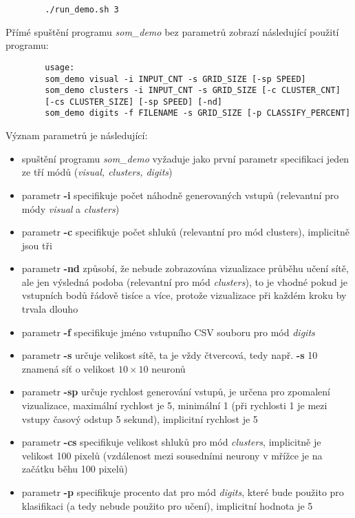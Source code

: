 \documentclass[11pt]{article}
\begin{document}
\begin{commandline}
	\begin{verbatim}
		./run_demo.sh 3
	\end{verbatim}
\end{commandline}

Přímé spuštění programu \textit{som\_demo} bez parametrů zobrazí následující použití programu:

\begin{commandline}
	\begin{verbatim}
		usage:
		som_demo visual -i INPUT_CNT -s GRID_SIZE [-sp SPEED]
		som_demo clusters -i INPUT_CNT -s GRID_SIZE [-c CLUSTER_CNT] 
		[-cs CLUSTER_SIZE] [-sp SPEED] [-nd]
		som_demo digits -f FILENAME -s GRID_SIZE [-p CLASSIFY_PERCENT]
	\end{verbatim}
\end{commandline}

Význam parametrů je následující:

\begin{itemize}
	\item spuštění programu \textit{som\_demo} vyžaduje jako první parametr specifikaci jeden ze tří módů (\textit{visual, clusters, digits})
	\item parametr \textbf{-i} specifikuje počet náhodně generovaných vstupů (relevantní pro módy \textit{visual} a \textit{clusters})
	\item parametr \textbf{-c} specifikuje počet shluků (relevantní pro mód clusters), implicitně jsou tři
	\item parametr \textbf{-nd} způsobí, že nebude zobrazována vizualizace průběhu učení sítě, ale jen výsledná podoba (relevantní pro mód \textit{clusters}), to je vhodné pokud je vstupních bodů řádově tisíce a více, protože vizualizace při každém kroku by trvala dlouho
	\item parametr \textbf{-f} specifikuje jméno vstupního CSV souboru pro mód \textit{digits}
	\item parametr \textbf{-s} určuje velikost sítě, ta je vždy čtvercová, tedy např. \textbf{-s} 10 znamená síť o velikost $10\times10$ neuronů
	\item parametr \textbf{-sp} určuje rychlost generování vstupů, je určena pro zpomalení vizualizace, maximální rychlost je 5, minimální 1 (při rychlosti 1 je mezi vstupy časový odstup 5 sekund), implicitní rychlost je 5
	\item parametr \textbf{-cs} specifikuje velikost shluků pro mód \textit{clusters}, implicitně je velikost 100 pixelů (vzdálenost mezi sousedními neurony v mřížce je na začátku běhu 100 pixelů)
	\item parametr \textbf{-p} specifikuje procento dat pro mód \textit{digits}, které bude použito pro klasifikaci (a tedy nebude použito pro učení), implicitní hodnota je 5
\end{itemize}
\end{document}
